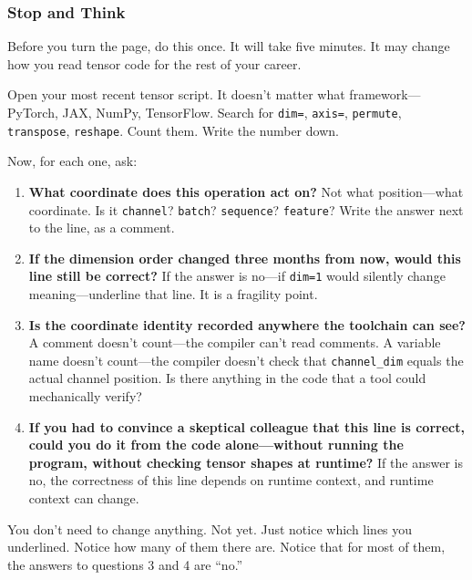\documentclass[11pt,titlepage]{article}
\begin{document}
\vspace{2em}

\hypertarget{stop-and-think}{%
\subsubsection{Stop and Think}\label{stop-and-think}}

Before you turn the page, do this once. It will take five minutes. It
may change how you read tensor code for the rest of your career.

Open your most recent tensor script. It doesn't matter what
framework---PyTorch, JAX, NumPy, TensorFlow. Search for \texttt{dim=},
\texttt{axis=}, \texttt{permute}, \texttt{transpose}, \texttt{reshape}.
Count them. Write the number down.

Now, for each one, ask:

\begin{enumerate}
\def\labelenumi{\arabic{enumi}.}
\item
  \textbf{What coordinate does this operation act on?} Not what
  position---what coordinate. Is it \texttt{channel}? \texttt{batch}?
  \texttt{sequence}? \texttt{feature}? Write the answer next to the
  line, as a comment.
\item
  \textbf{If the dimension order changed three months from now, would
  this line still be correct?} If the answer is no---if \texttt{dim=1}
  would silently change meaning---underline that line. It is a fragility
  point.
\item
  \textbf{Is the coordinate identity recorded anywhere the toolchain can
  see?} A comment doesn't count---the compiler can't read comments. A
  variable name doesn't count---the compiler doesn't check that
  \texttt{channel\_dim} equals the actual channel position. Is there
  anything in the code that a tool could mechanically verify?
\item
  \textbf{If you had to convince a skeptical colleague that this line is
  correct, could you do it from the code alone---without running the
  program, without checking tensor shapes at runtime?} If the answer is
  no, the correctness of this line depends on runtime context, and
  runtime context can change.
\end{enumerate}

You don't need to change anything. Not yet. Just notice which lines you
underlined. Notice how many of them there are. Notice that for most of
them, the answers to questions 3 and 4 are ``no.''
\end{document}
